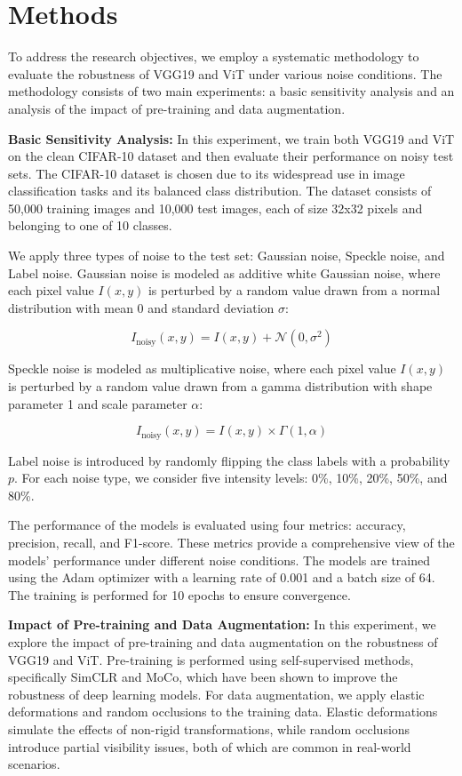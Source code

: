 \documentclass{article}
\begin{document}
\section{Methods}
To address the research objectives, we employ a systematic methodology to evaluate the robustness of VGG19 and ViT under various noise conditions. The methodology consists of two main experiments: a basic sensitivity analysis and an analysis of the impact of pre-training and data augmentation.

\textbf{Basic Sensitivity Analysis:} In this experiment, we train both VGG19 and ViT on the clean CIFAR-10 dataset and then evaluate their performance on noisy test sets. The CIFAR-10 dataset is chosen due to its widespread use in image classification tasks and its balanced class distribution. The dataset consists of 50,000 training images and 10,000 test images, each of size 32x32 pixels and belonging to one of 10 classes.

We apply three types of noise to the test set: Gaussian noise, Speckle noise, and Label noise. Gaussian noise is modeled as additive white Gaussian noise, where each pixel value \( I(x, y) \) is perturbed by a random value drawn from a normal distribution with mean 0 and standard deviation \(\sigma\):

\[
I_{\text{noisy}}(x, y) = I(x, y) + \mathcal{N}(0, \sigma^2)
\]

Speckle noise is modeled as multiplicative noise, where each pixel value \( I(x, y) \) is perturbed by a random value drawn from a gamma distribution with shape parameter 1 and scale parameter \(\alpha\):

\[
I_{\text{noisy}}(x, y) = I(x, y) \times \Gamma(1, \alpha)
\]

Label noise is introduced by randomly flipping the class labels with a probability \( p \). For each noise type, we consider five intensity levels: 0\%, 10\%, 20\%, 50\%, and 80\%.

The performance of the models is evaluated using four metrics: accuracy, precision, recall, and F1-score. These metrics provide a comprehensive view of the models' performance under different noise conditions. The models are trained using the Adam optimizer with a learning rate of 0.001 and a batch size of 64. The training is performed for 10 epochs to ensure convergence.

\textbf{Impact of Pre-training and Data Augmentation:} In this experiment, we explore the impact of pre-training and data augmentation on the robustness of VGG19 and ViT. Pre-training is performed using self-supervised methods, specifically SimCLR and MoCo, which have been shown to improve the robustness of deep learning models. For data augmentation, we apply elastic deformations and random occlusions to the training data. Elastic deformations simulate the effects of non-rigid transformations, while random occlusions introduce partial visibility issues, both of which are common in real-world scenarios.
\end{document}
